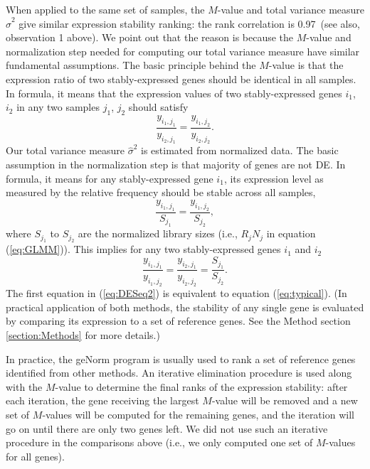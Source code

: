\documentclass[letterpaper,12pt]{article}
\newcommand{\recallrankcorrelation}{0.97~}
\begin{document}
When applied to the same set of samples, the $M$-value and total variance
measure $\hat\sigma^2$ give similar expression stability ranking: the rank
correlation is \recallrankcorrelation (see also, observation 1 above).
We point out that the reason is because the $M$-value and normalization step
needed for computing our total variance measure have similar fundamental
assumptions. 
The basic principle
behind the $M$-value is that the expression ratio of two stably-expressed
genes should be identical in all samples. In formula, it means that the
expression values of two stably-expressed genes $i_1$, $i_2$ in any two samples $j_1$, $j_2$
should satisfy
\begin{equation}\label{eq:typical}
   \dfrac{y_{i_1, j_1}}{y_{i_2, j_1}} = \dfrac{y_{i_1, j_2}}{y_{i_2, j_2}}.
\end{equation} 
Our total variance measure $\hat\sigma^2$ is estimated from normalized data.
The basic assumption in the normalization step is that majority of genes are
not DE. In formula, it means for any stably-expressed gene $i_1$, its expression
level as measured by the relative frequency should be stable across all
samples,
\begin{equation}\label{eq:DESeq} 
    \frac{y_{i_1, j_1}}{S_{j_1}}= \dfrac{y_{i_1, j_2}}{S_{j_2}},
\end{equation}
where $S_{j_1}$ to $S_{j_2}$ are the normalized library sizes (i.e., $R_j N_j$ in equation (\ref{eq:GLMM})).
This implies for any two stably-expressed genes $i_1$ and $i_2$
\begin{equation}\label{eq:DESeq2} 
    \frac{y_{i_1, j_1}}{y_{i_1, j_2}} = \frac{y_{i_2, j_1}}{y_{i_2, j_2}} =
    \frac{S_{j_1}}{S_{j_2}}.
\end{equation}
The first equation in (\ref{eq:DESeq2}) is equivalent to equation
(\ref{eq:typical}). (In practical application of both methods, the stability
of any single gene is evaluated by comparing its expression to a set of
reference genes. See the Method section \ref{section:Methods} for more details.)

In practice, the geNorm program \citep{vandesompele2002accurate} is usually
used to rank a set of reference genes identified from other methods.  An
iterative elimination procedure is used along with the $M$-value to determine
the final ranks of the expression stability:  after each iteration, the gene
receiving the largest $M$-value will be removed and a new set of $M$-values
will be computed for the remaining genes, and the iteration will go on until
there are only two genes left.  We did not use such an iterative procedure in
the comparisons above (i.e., we only computed one set of $M$-values for all
genes). 
\end{document}
